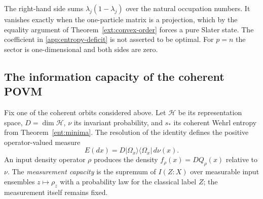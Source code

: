 The right-hand side sums $\lambda_j(1-\lambda_j)$ over the natural
occupation numbers.  It vanishes exactly when the one-particle matrix
is a projection, which by the equality argument of
Theorem~\ref{ext:convex-order} forces a pure Slater state.
The coefficient in \eqref{app:entropy-deficit} is not asserted to be
optimal.  For $p=n$ the sector is one-dimensional and both sides
are zero.

\subsection{The information capacity of the coherent POVM}

Fix one of the coherent orbits considered above.  Let $\mathcal H$
be its representation space, $D=\dim\mathcal H$, $\nu$ its invariant
probability, and $s_*$ its coherent Wehrl entropy from
Theorem~\ref{ent:minima}.  The resolution of the identity defines
the positive operator-valued measure
\begin{equation}
 E(dx)=D|\Omega_x\rangle\langle\Omega_x|\,d\nu(x).
 \label{app:povm}
\end{equation}
An input density operator $\rho$ produces the density
$f_\rho(x)=D Q_\rho(x)$ relative to $\nu$.
The \emph{measurement capacity} is the supremum of $I(Z:X)$ over
measurable input ensembles $z\mapsto\rho_z$ with a probability law for the
classical label $Z$; the measurement itself remains fixed.

